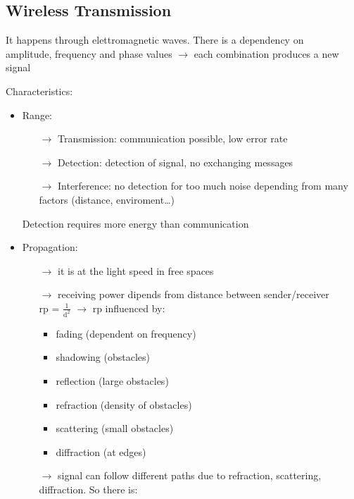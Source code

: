 \subsection{Wireless Transmission}

It happens through elettromagnetic waves. There is a dependency on\\amplitude,
frequency and phase values $\rightarrow$ each combination produces a new signal

Characteristics:
\begin{itemize}
    \item Range:
    \begin{itemize}
        \item[$\rightarrow$] Transmission: communication possible, low error rate
        \item[$\rightarrow$] Detection: detection of signal, no exchanging
        messages
        \item[$\rightarrow$] Interference: no detection for too much noise
        depending from many \\factors (distance, enviroment\dots)
    \end{itemize}
    Detection requires more energy than communication
    \item Propagation:
    \begin{itemize}
        \item[$\rightarrow$] it is at the light speed in free spaces
        \item[$\rightarrow$] receiving power dipends from distance between
        sender/receiver\\
        rp = $\frac{1}{\text{d}^2}$ $\rightarrow$ rp influenced by:
        \begin{itemize}
            \item fading (dependent on frequency)
            \item shadowing (obstacles)
            \item reflection (large obstacles)
            \item refraction (density of obstacles)
            \item scattering (small obstacles)
            \item diffraction (at edges)
        \end{itemize}
        \newpage
        \item[$\rightarrow$] signal can follow different paths due to refraction,
        scattering, diffraction. So there is:
        \begin{itemize}

\end{itemize}
\end{itemize}
\end{itemize}
